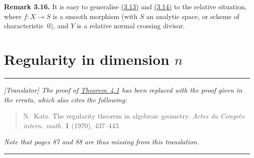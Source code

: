 \documentclass{report}
\newenvironment{rmenv}[1]
  {\phantomsection\par\medskip\noindent\textbf{#1.}\rmfamily}
  {\par\medskip}
\begin{document}
\begin{rmenv}{Remark 3.16}
\label{II.3.16}
  It is easy to generalise \hyperref[II.3.13]{(3.13)} and \hyperref[II.3.14]{(3.14)} to the relative situation, where $f\colon X\to S$ is a smooth morphism (with $S$ an analytic space, or scheme of characteristic~$0$), and $Y$ is a relative normal crossing divisor.
\end{rmenv}


\section{Regularity in dimension \texorpdfstring{$n$}{n}}
\label{II.4}

\medskip
\hrule
\medskip

\emph{[Translator] The proof of \hyperref[II.4.1]{Theorem~4.1} has been replaced with the proof given in the errata, which also cites the following:}
\begin{quote}
  N.~Katz.
  The regularity theorem in algebraic geometry.
  \emph{Actes du Congr\`{e}s intern. math.} \textbf{1} (1970), 437--443.
\end{quote}
\emph{Note that pages 87 and 88 are thus missing from this translation.}

\medskip
\hrule
\medskip
\end{document}

